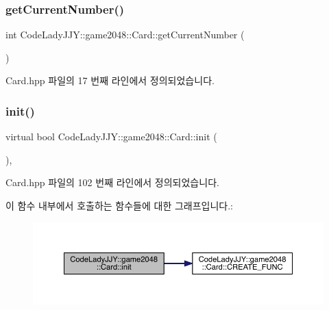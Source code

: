 \subsubsection{\texorpdfstring{get\+Current\+Number()}{getCurrentNumber()}}
{\footnotesize\ttfamily int Code\+Lady\+J\+J\+Y\+::game2048\+::\+Card\+::get\+Current\+Number (\begin{DoxyParamCaption}{ }\end{DoxyParamCaption})\hspace{0.3cm}{\ttfamily [inline]}}



Card.\+hpp 파일의 17 번째 라인에서 정의되었습니다.

\mbox{\label{class_code_lady_j_j_y_1_1game2048_1_1_card_a5efe85fbf1117b9a64cc13311352284c}} 
\subsubsection{\texorpdfstring{init()}{init()}}
{\footnotesize\ttfamily virtual bool Code\+Lady\+J\+J\+Y\+::game2048\+::\+Card\+::init (\begin{DoxyParamCaption}{ }\end{DoxyParamCaption})\hspace{0.3cm}{\ttfamily [inline]}, {\ttfamily [virtual]}}



Card.\+hpp 파일의 102 번째 라인에서 정의되었습니다.

이 함수 내부에서 호출하는 함수들에 대한 그래프입니다.\+:
\nopagebreak
\begin{figure}[H]
\begin{center}
\leavevmode
\includegraphics[width=350pt]{class_code_lady_j_j_y_1_1game2048_1_1_card_a5efe85fbf1117b9a64cc13311352284c_cgraph}
\end{center}
\end{figure}
\mbox{\label{class_code_lady_j_j_y_1_1game2048_1_1_card_a6ad341b10626a9cc1aafe8229fa61ea6}} 
